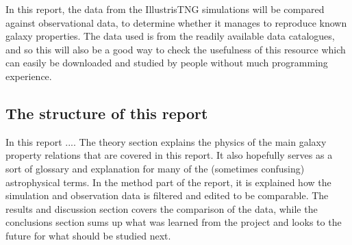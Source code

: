 In this report, the data from the IllustrisTNG simulations will be compared against observational data, to determine whether it manages to reproduce known galaxy properties. The data used is from the readily available data catalogues, and so this will also be a good way to check the usefulness of this resource which can easily be downloaded and studied by people without much programming experience.


\subsection{The structure of this report}
In this report ....
The theory section explains the physics of the main galaxy property relations that are covered in this report. It also hopefully serves as a sort of glossary and explanation for many of the (sometimes confusing) astrophysical terms. In the method part of the report, it is explained how the simulation and observation data is filtered and edited to be comparable. The results and discussion section covers the comparison of the data, while the conclusions section sums up what was learned from the project and looks to the future for what should be studied next.
